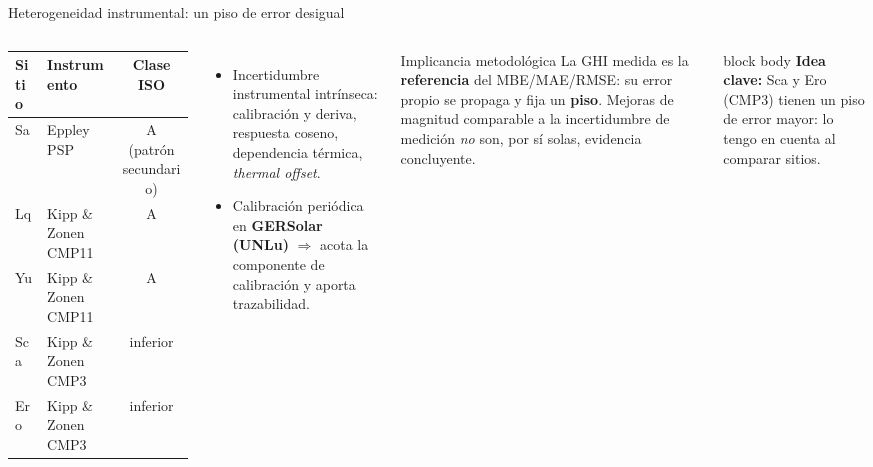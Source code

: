 \documentclass[aspectratio=169,11pt]{beamer}
\newcommand{\clave}[1]{%
  \begin{beamercolorbox}[wd=\linewidth,sep=6pt,rounded=true]{block body}%
    \footnotesize\textbf{\color{primary}Idea clave: }#1%
  \end{beamercolorbox}}
\begin{document}
\begin{frame}{Heterogeneidad instrumental: un piso de error desigual}
  \scriptsize
  \begin{columns}[T]
    \begin{tabular}{@{}llc@{}}
      \toprule
      \textbf{Sitio} & \textbf{Instrumento} & \textbf{Clase ISO}\\
      \midrule
      Sa  & Eppley PSP            & A (patrón secundario)\\
      Lq  & Kipp \& Zonen CMP11   & A\\
      Yu  & Kipp \& Zonen CMP11   & A\\
      Sca & Kipp \& Zonen CMP3    & inferior\\
      Ero & Kipp \& Zonen CMP3    & inferior\\
      \bottomrule
    \end{tabular}
    \vspace{0.5em}
    \begin{itemize}
      \item Incertidumbre instrumental intrínseca: calibración y deriva, respuesta coseno, dependencia térmica, \emph{thermal offset}.
      \item Calibración periódica en \textbf{GERSolar (UNLu)} $\Rightarrow$ acota la componente de calibración y aporta trazabilidad.
    \end{itemize}
    \begin{block}{Implicancia metodológica}
      La GHI medida es la \textbf{referencia} del MBE/MAE/RMSE: su error propio se propaga y fija un \textbf{piso}. Mejoras de magnitud comparable a la incertidumbre de medición \emph{no} son, por sí solas, evidencia concluyente.
    \end{block}
    \clave{Sca y Ero (CMP3) tienen un piso de error mayor: lo tengo en cuenta al comparar sitios.}
  \end{columns}
\end{frame}
\end{document}
